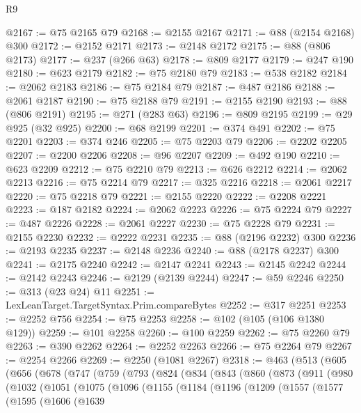 \begin{lexlean}{R9}
\begin{coremodule}
@2167 := @75 @2165 @79
@2168 := @2155 @2167
@2171 := @88 (@2154 @2168) @300
@2172 := @2152 @2171
@2173 := @2148 @2172
@2175 := @88 (@806 @2173)
@2177 := @237 (@266 @63)
@2178 := @809 @2177
@2179 := @247 @190
@2180 := @623 @2179
@2182 := @75 @2180 @79
@2183 := @538 @2182
@2184 := @2062 @2183
@2186 := @75 @2184 @79
@2187 := @487 @2186
@2188 := @2061 @2187
@2190 := @75 @2188 @79
@2191 := @2155 @2190
@2193 := @88 (@806 @2191)
@2195 := @271 (@283 @63)
@2196 := @809 @2195
@2199 := @29 @925 (@32 @925)
@2200 := @68 @2199
@2201 := @374 @491
@2202 := @75 @2201
@2203 := @374 @246
@2205 := @75 @2203 @79
@2206 := @2202 @2205
@2207 := @2200 @2206
@2208 := @96 @2207
@2209 := @492 @190
@2210 := @623 @2209
@2212 := @75 @2210 @79
@2213 := @626 @2212
@2214 := @2062 @2213
@2216 := @75 @2214 @79
@2217 := @325 @2216
@2218 := @2061 @2217
@2220 := @75 @2218 @79
@2221 := @2155 @2220
@2222 := @2208 @2221
@2223 := @187 @2182
@2224 := @2062 @2223
@2226 := @75 @2224 @79
@2227 := @487 @2226
@2228 := @2061 @2227
@2230 := @75 @2228 @79
@2231 := @2155 @2230
@2232 := @2222 @2231
@2235 := @88 (@2196 @2232) @300
@2236 := @2193 @2235
@2237 := @2148 @2236
@2240 := @88 (@2178 @2237) @300
@2241 := @2175 @2240
@2242 := @2147 @2241
@2243 := @2145 @2242
@2244 := @2142 @2243
@2246 := @2129 (@2139 @2244)
@2247 := @59 @2246
@2250 := @313 (@23 @24) @11
@2251 := LexLeanTarget.TargetSyntax.Prim.compareBytes
@2252 := @317 @2251
@2253 := @2252 @756
@2254 := @75 @2253
@2258 := @102 (@105 (@106 @1380 @129))
@2259 := @101 @2258
@2260 := @100 @2259
@2262 := @75 @2260 @79
@2263 := @390 @2262
@2264 := @2252 @2263
@2266 := @75 @2264 @79
@2267 := @2254 @2266
@2269 := @2250 (@1081 @2267)
@2318 := @463
    (@513
      (@605
        (@656
          (@678
            (@747
              (@759
                (@793
                  (@824
                    (@834
                      (@843
                        (@860
                          (@873
                            (@911
                              (@980
                                (@1032
                                  (@1051
                                    (@1075
                                      (@1096
                                        (@1155
                                          (@1184
                                            (@1196
                                              (@1209
                                                (@1557
                                                  (@1577
                                                    (@1595
                                                      (@1606
                                                        (@1639

\end{coremodule}
\end{lexlean}
